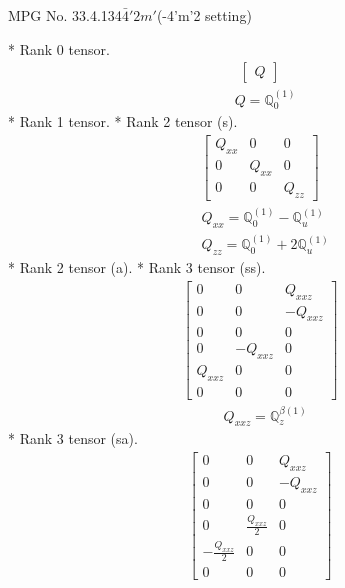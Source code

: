 \documentclass[fleqn,8pt,landscape]{jsarticle}
\begin{document}
\setcounter{MaxMatrixCols}{32}

\renewcommand{\tablename}{Table~}
\renewcommand{\figurename}{Figure~}
\begin{center}
\LARGE
MPG No. 33.4.134\quad$\bar{4}'2m'$\quad(-4'm'2 setting)
\end{center}
* Rank 0 tensor.
\begin{align*}
\begin{bmatrix} Q \end{bmatrix}
\end{align*}
\begin{align*}
& Q = \mathbb{Q}_{0}^{(1)}
\end{align*}
* Rank 1 tensor.
* Rank 2 tensor (s).
\begin{align*}
\begin{bmatrix} Q_{xx} & 0 & 0 \\ 0 & Q_{xx} & 0 \\ 0 & 0 & Q_{zz} \end{bmatrix}
\end{align*}
\begin{align*}
& Q_{xx} = \mathbb{Q}_{0}^{(1)} - \mathbb{Q}_{u}^{(1)} \\
& Q_{zz} = \mathbb{Q}_{0}^{(1)} + 2 \mathbb{Q}_{u}^{(1)}
\end{align*}
* Rank 2 tensor (a).
* Rank 3 tensor (ss).
\begin{align*}
\begin{bmatrix} 0 & 0 & Q_{xxz} \\ 0 & 0 & - Q_{xxz} \\ 0 & 0 & 0 \\ 0 & - Q_{xxz} & 0 \\ Q_{xxz} & 0 & 0 \\ 0 & 0 & 0 \end{bmatrix}
\end{align*}
\begin{align*}
& Q_{xxz} = \mathbb{Q}_{z}^{\beta(1)}
\end{align*}
* Rank 3 tensor (sa).
\begin{align*}
\begin{bmatrix} 0 & 0 & Q_{xxz} \\ 0 & 0 & - Q_{xxz} \\ 0 & 0 & 0 \\ 0 & \frac{Q_{xxz}}{2} & 0 \\ - \frac{Q_{xxz}}{2} & 0 & 0 \\ 0 & 0 & 0 \end{bmatrix}
\end{align*}
\end{document}
